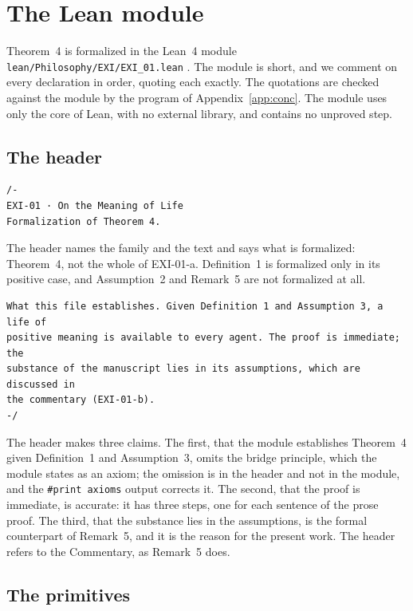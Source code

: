 \section{The Lean module}\label{s:lean}

Theorem~4 is formalized in the Lean~4 module \texttt{lean/Philosophy/EXI/EXI\_01.lean} \citep{deMouraUllrich2021}. The module is short, and we comment on every declaration in order, quoting each exactly. The quotations are checked against the module by the program of Appendix~\ref{app:conc}. The module uses only the core of Lean, with no external library, and contains no unproved step.

\subsection{The header}

\begin{lstlisting}
/-
EXI-01 · On the Meaning of Life
Formalization of Theorem 4.
\end{lstlisting}

The header names the family and the text and says what is formalized: Theorem~4, not the whole of EXI-01-a. Definition~1 is formalized only in its positive case, and Assumption~2 and Remark~5 are not formalized at all.

\begin{lstlisting}
What this file establishes. Given Definition 1 and Assumption 3, a life of
positive meaning is available to every agent. The proof is immediate; the
substance of the manuscript lies in its assumptions, which are discussed in
the commentary (EXI-01-b).
-/
\end{lstlisting}

The header makes three claims. The first, that the module establishes Theorem~4 given Definition~1 and Assumption~3, omits the bridge principle, which the module states as an axiom; the omission is in the header and not in the module, and the \texttt{\#print axioms} output corrects it. The second, that the proof is immediate, is accurate: it has three steps, one for each sentence of the prose proof. The third, that the substance lies in the assumptions, is the formal counterpart of Remark~5, and it is the reason for the present work. The header refers to the Commentary, as Remark~5 does.

\subsection{The primitives}

